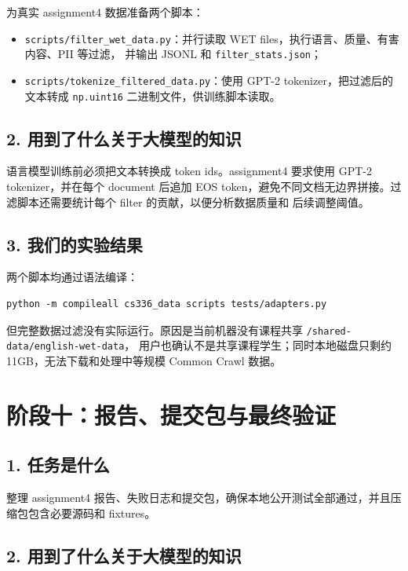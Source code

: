 \documentclass[UTF8,11pt]{ctexart}
\begin{document}
为真实 assignment4 数据准备两个脚本：

\begin{itemize}
  \item \texttt{scripts/filter\_wet\_data.py}：并行读取 WET files，执行语言、质量、有害内容、PII 等过滤，
  并输出 JSONL 和 \texttt{filter\_stats.json}；
  \item \texttt{scripts/tokenize\_filtered\_data.py}：使用 GPT-2 tokenizer，把过滤后的文本转成
  \texttt{np.uint16} 二进制文件，供训练脚本读取。
\end{itemize}

\subsection*{2. 用到了什么关于大模型的知识}

语言模型训练前必须把文本转换成 token ids。assignment4 要求使用 GPT-2 tokenizer，并在每个 document
后追加 EOS token，避免不同文档无边界拼接。过滤脚本还需要统计每个 filter 的贡献，以便分析数据质量和
后续调整阈值。

\subsection*{3. 我们的实验结果}

两个脚本均通过语法编译：

\begin{lstlisting}
python -m compileall cs336_data scripts tests/adapters.py
\end{lstlisting}

但完整数据过滤没有实际运行。原因是当前机器没有课程共享 \texttt{/shared-data/english-wet-data}，
用户也确认不是共享课程学生；同时本地磁盘只剩约 11GB，无法下载和处理中等规模 Common Crawl 数据。

\section{阶段十：报告、提交包与最终验证}

\subsection*{1. 任务是什么}

整理 assignment4 报告、失败日志和提交包，确保本地公开测试全部通过，并且压缩包包含必要源码和 fixtures。

\subsection*{2. 用到了什么关于大模型的知识}
\end{document}
